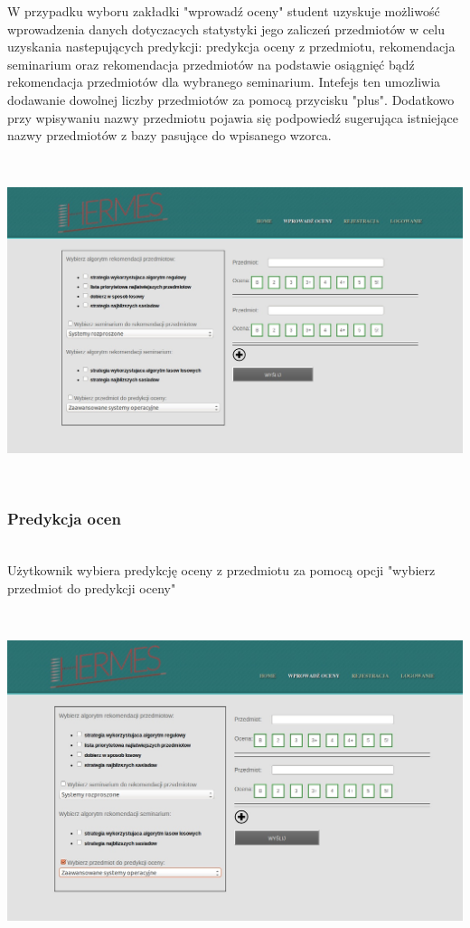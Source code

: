 \documentclass[licencjacka]{pracamgr}
\begin{document}
W przypadku wyboru zakładki "wprowadź oceny" student uzyskuje możliwość wprowadzenia danych dotyczacych statystyki jego zaliczeń przedmiotów w celu uzyskania nastepujących predykcji: predykcja oceny z przedmiotu, rekomendacja seminarium oraz rekomendacja przedmiotów na podstawie osiągnięć bądź rekomendacja przedmiotów dla wybranego seminarium. Intefejs ten umozliwia dodawanie dowolnej liczby przedmiotów za pomocą przycisku "plus". Dodatkowo przy wpisywaniu nazwy przedmiotu pojawia się podpowiedź sugerująca istniejące nazwy przedmiotów z bazy pasujące do wpisanego wzorca.   \par
~\\
\begin{minipage}{\linewidth}
	\centering
           \includegraphics[scale=0.50]{interfejsWstepny.jpg}
\end{minipage} \\ 

\newpage

\subsubsection{Predykcja ocen}
~\\ \indent
Użytkownik wybiera predykcję oceny z przedmiotu za pomocą opcji "wybierz przedmiot do predykcji oceny" \par
~\\
\begin{minipage}{\linewidth}
	\centering
           \includegraphics[scale=0.5]{predykcjaPrzedmSelect.jpg}
\end{minipage} \\ \\
\end{document}
